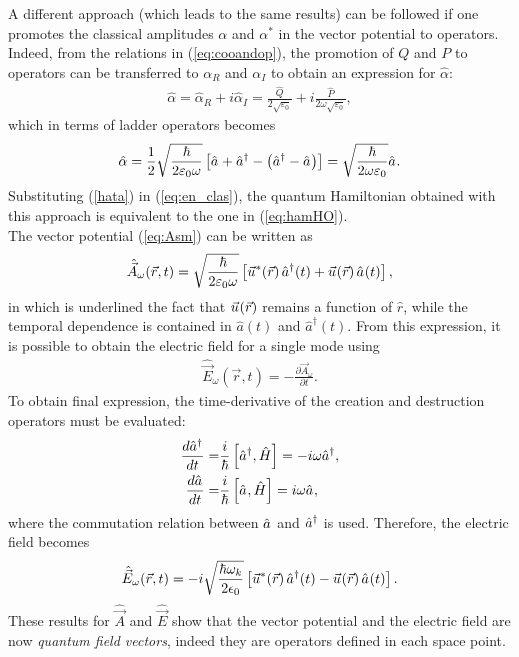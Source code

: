 A different approach (which leads to the same results) can be followed if one promotes the classical amplitudes $\alpha$ and $\alpha^*$ in the vector potential to operators. Indeed, from the relations in (\ref{eq:cooandop}), the promotion of $Q$ and $P$ to operators can be transferred to $\alpha_R$ and $\alpha_I$ to obtain an expression for $\hat{\alpha}$: 
\begin{align}
    \hat{\alpha} = \hat{\alpha}_R + i \hat{\alpha}_I = \frac{\hat{Q}}{2 \sqrt{\varepsilon_0}} + i \frac{\hat{P}}{2 \omega \sqrt{\varepsilon_0}},
\end{align}
which in terms of ladder operators becomes
\begin{align}
    \hat{\alpha} = \frac{1}{2} \sqrt{\frac{\hbar}{2 \varepsilon_0 \omega}} \left[ \hat{a}_{} + \hat{a}^{\dagger}_{} - \left( \hat{a}^{\dagger}_{} - \hat{a}_{} \right) \right] = \sqrt{\frac{\hbar}{2 \omega \varepsilon_0}} \hat{a}_{}. 
    \label{hata}
\end{align}
Substituting (\ref{hata}) in (\ref{eq:en_clas}), the quantum Hamiltonian obtained with this approach is equivalent to the one in (\ref{eq:hamHO}). \\
The vector potential (\ref{eq:Asm}) can be written as 
\begin{equation}
    \hat{\vec{A}}_\omega(\vec{r},t) = \sqrt{\frac{\hbar}{2 \varepsilon_{0} \omega}}\left[ \vec{u}_{}^{\ast}(\vec{r}) \, \hat{a}^{\dagger}_{}(t) + \vec{u}_{}(\vec{r}) \, \hat{a}_{}(t) \right], \label{eq:potsm}
\end{equation} 
in which is underlined the fact that $\vec{u}_{}(\vec{r})$ remains a function of $\hat{r}$, while the temporal dependence is contained in $\hat{a}(t)$ and $\hat{a}^\dagger(t)$. From this expression, it is possible to obtain the electric field for a single mode using 
\begin{align*}
    \hat{\vec{E}}_\omega (\vec{r}, t) = - \frac{\partial \vec{A}_\omega}{\partial t}. 
\end{align*}
To obtain final expression, the time-derivative of the creation and destruction operators must be evaluated:
\begin{align*}
    \frac{d \hat{a}^{\dagger}_{}}{d t} =& \frac{i}{\hbar}\left[\hat{a}^{\dagger}_{}, \hat{H}\right] = -i \omega\hat{a}^{\dagger}_{}, \\
    \frac{d \hat{a}_{}}{d t} =& \frac{i}{\hbar}\left[\hat{a}_{}, \hat{H}\right] = i \omega \hat{a}_{},
\end{align*}
where the commutation relation between $\hat{a}_{}$ and $\hat{a}^{\dagger}_{}$ is used. Therefore, the electric field becomes 
\begin{align}
    \hat{\vec{E}}_\omega(\vec{r}, t) = -i \sqrt{\frac{\hbar \omega_k}{2 \epsilon_0}} \left[\vec{u}_{}^{\ast}(\vec{r}) \, \hat{a}^{\dagger}_{}(t)  - \vec{u}_{}(\vec{r}) \, \hat{a}_{}(t) \right]. 
    \label{eq:elfield_sm}
\end{align}
These results for $\hat{\vec{A}}$ and $\hat{\vec{E}}$ show that the vector potential and the electric field are now \textit{quantum field vectors}, indeed they are operators defined in each space point. \\


